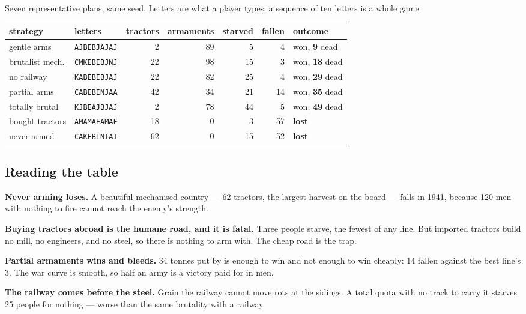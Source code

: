 \documentclass[11pt,a4paper]{article}
\begin{document}
Seven representative plans, same seed. Letters are what a player types; a
sequence of ten letters is a whole game.

\begin{center}
\footnotesize
\begin{tabular}{@{}llrrrrl@{}}
\toprule
strategy & letters & tractors & armaments & starved & fallen & outcome \\
\midrule
gentle arms      & \texttt{AJBEBJAJAJ} &  2 & 89 &  5 &  4 & won, \textbf{9} dead \\
brutalist mech.  & \texttt{CMKEBIBJNJ} & 22 & 98 & 15 &  3 & won, \textbf{18} dead \\
no railway       & \texttt{KABEBIBJAJ} & 22 & 82 & 25 &  4 & won, \textbf{29} dead \\
partial arms     & \texttt{CABEBINJAA} & 42 & 34 & 21 & 14 & won, \textbf{35} dead \\
totally brutal   & \texttt{KJBEAJBJAJ} &  2 & 78 & 44 &  5 & won, \textbf{49} dead \\
bought tractors  & \texttt{AMAMAFAMAF} & 18 &  0 &  3 & 57 & \textbf{lost} \\
never armed      & \texttt{CAKEBINIAI} & 62 &  0 & 15 & 52 & \textbf{lost} \\
\bottomrule
\end{tabular}
\end{center}

\subsection{Reading the table}

\textbf{Never arming loses.} A beautiful mechanised country --- 62 tractors,
the largest harvest on the board --- falls in 1941, because 120 men with
nothing to fire cannot reach the enemy's strength.

\textbf{Buying tractors abroad is the humane road, and it is fatal.} Three
people starve, the fewest of any line. But imported tractors build no mill, no
engineers, and no steel, so there is nothing to arm with. The cheap road is the
trap.

\textbf{Partial armaments wins and bleeds.} 34 tonnes put by is enough to win
and not enough to win cheaply: 14 fallen against the best line's 3. The war
curve is smooth, so half an army is a victory paid for in men.

\textbf{The railway comes before the steel.} Grain the railway cannot move rots
at the sidings. A total quota with no track to carry it starves 25 people for
nothing --- worse than the same brutality with a railway.
\end{document}
